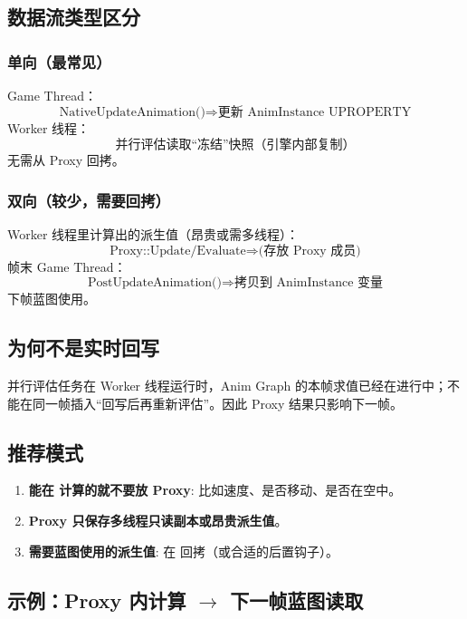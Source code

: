 \documentclass[10pt,openright,oneside,CJKmath]{MyBook}
\begin{document}
\subsection{数据流类型区分}
\subsubsection{单向（最常见）}
Game Thread：
\[
\text{NativeUpdateAnimation()} \Rightarrow \text{更新 AnimInstance UPROPERTY}
\]
Worker 线程：
\[
\text{并行评估读取“冻结”快照（引擎内部复制）}
\]
无需从 Proxy 回拷。

\subsubsection{双向（较少，需要回拷）}
Worker 线程里计算出的派生值（昂贵或需多线程）：
\[
\text{Proxy::Update/Evaluate} \Longrightarrow \text{(存放 Proxy 成员)}
\]
帧末 Game Thread：
\[
\text{PostUpdateAnimation()} \Longrightarrow \text{拷贝到 AnimInstance 变量}
\]
下帧蓝图使用。

\subsection{为何不是实时回写}
并行评估任务在 Worker 线程运行时，Anim Graph 的本帧求值已经在进行中；不能在同一帧插入“回写后再重新评估”。因此 Proxy 结果只影响下一帧。

\subsection{推荐模式}
\begin{enumerate}
  \item \textbf{能在  计算的就不要放 Proxy}: 比如速度、是否移动、是否在空中。
  \item \textbf{Proxy 只保存多线程只读副本或昂贵派生值}。
  \item \textbf{需要蓝图使用的派生值}: 在  回拷（或合适的后置钩子）。
\end{enumerate}

\subsection{示例：Proxy 内计算 \(\rightarrow\) 下一帧蓝图读取}
\end{document}
